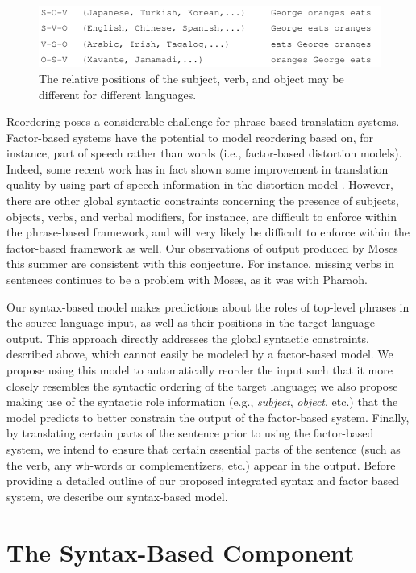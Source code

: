 \documentclass[11pt]{report}
\theoremstyle{plain}
\begin{document}
{\begin{figure}
\centering
\includegraphics[scale=1]{brooke-basicorder}
\caption{The relative positions of the subject, verb, and object may
be different for different languages.}
\label{basicorder}
\end{figure}

Reordering poses a considerable challenge for phrase-based translation
systems. Factor-based systems have the potential to model reordering
based on, for instance, part of speech rather than words (i.e.,
factor-based distortion models). Indeed, some recent work has in fact
shown some improvement in translation quality by using part-of-speech
information in the distortion model . However, there are
other global syntactic constraints concerning the presence of
subjects, objects, verbs, and verbal modifiers, for instance, are
difficult to enforce within the phrase-based framework, and will very
likely be difficult to enforce within the factor-based framework as
well. Our observations of output produced by Moses this summer are
consistent with this conjecture. For instance, missing verbs in
sentences continues to be a problem with Moses, as it was with
Pharaoh.

Our syntax-based model makes predictions about the roles of top-level
phrases in the source-language input, as well as their positions in
the target-language output. This approach directly addresses the
global syntactic constraints, described above, which cannot easily be
modeled by a factor-based model. We propose using this model to
automatically reorder the input such that it more closely resembles
the syntactic ordering of the target language; we also propose making
use of the syntactic role information (e.g., {\em subject}, {\em
object}, etc.) that the model predicts to better constrain the output
of the factor-based system. Finally, by translating certain parts of
the sentence prior to using the factor-based system, we intend to
ensure that certain essential parts of the sentence (such as the verb,
any wh-words or complementizers, etc.) appear in the output. Before
providing a detailed outline of our proposed integrated syntax and
factor based system, we describe our syntax-based model.

\section{The Syntax-Based Component}
\label{framework}

}
\end{document}
